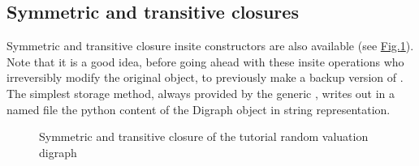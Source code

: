 \documentclass[a4paper,12pt,english]{sphinxhowto}
\let\sphinxpxdimen\pdfpxdimen\else\newdimen\sphinxpxdimen
\begin{document}
\subsection{Symmetric and transitive closures}
\label{\detokenize{tutorial:symmetric-and-transitive-closures}}
Symmetric and transitive closure in\sphinxhyphen{}site constructors are also available (see \hyperref[\detokenize{tutorial:strongcomponents}]{Fig.\@ \ref{\detokenize{tutorial:strongcomponents}}}). Note that it is a good idea, before going ahead with these in\sphinxhyphen{}site operations who irreversibly modify the original  object, to previously make a backup version of . The simplest storage method, always provided by the generic , writes out in a named file the python content of the Digraph object in string representation.
\def\sphinxLiteralBlockLabel{\label{\detokenize{tutorial:transitiveclosure}}}
\begin{sphinxVerbatim}[commandchars=\\\{\},numbers=left,firstnumber=1,stepnumber=1]
\end{sphinxVerbatim}

\begin{figure}[H]
\centering
\capstart

\noindent\sphinxincludegraphics[width=300\sphinxpxdimen]{{strongComponents}.png}
\caption{Symmetric and transitive closure of the tutorial random valuation digraph}\label{\detokenize{tutorial:strongcomponents}}\end{figure}
\end{document}
